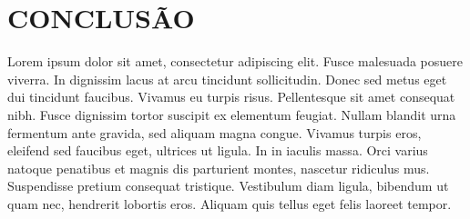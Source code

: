 \section{CONCLUSÃO}

Lorem ipsum dolor sit amet, consectetur adipiscing elit. Fusce malesuada posuere viverra. In dignissim lacus at arcu tincidunt sollicitudin. Donec sed metus eget dui tincidunt faucibus. Vivamus eu turpis risus. Pellentesque sit amet consequat nibh. Fusce dignissim tortor suscipit ex elementum feugiat. Nullam blandit urna fermentum ante gravida, sed aliquam magna congue. Vivamus turpis eros, eleifend sed faucibus eget, ultrices ut ligula. In in iaculis massa. Orci varius natoque penatibus et magnis dis parturient montes, nascetur ridiculus mus. Suspendisse pretium consequat tristique. Vestibulum diam ligula, bibendum ut quam nec, hendrerit lobortis eros. Aliquam quis tellus eget felis laoreet tempor.